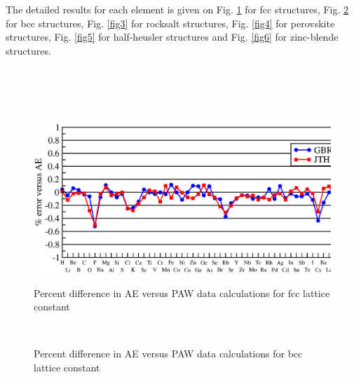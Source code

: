 \documentclass[10pt]{revtex4}
\begin{document}
The detailed results for each element is given on Fig. \ref{fig1} for fcc structures, Fig. \ref{fig2} for bcc structures,  Fig. \ref{fig3} for rocksalt structures, Fig. \ref{fig4} for perovskite structures, Fig. \ref{fig5} for half-heusler structures and Fig. \ref{fig6} for zinc-blende structures. 
\\
\\
\\
\\
\\

\begin{figure}[H]
\centering
{\resizebox{13.0cm}{!}
{\includegraphics{fig-fcc.eps}}} \\
\caption{Percent difference in AE versus PAW data calculations for fcc lattice constant}
\label{fig1}
\end{figure}



\begin{figure}[H]
\begin{center}
{\resizebox{13.0cm}{!}
{}} \\
\caption{Percent difference in AE versus PAW data calculations for bcc lattice constant}
\label{fig2}
\end{center}
\end{figure}
\end{document}
